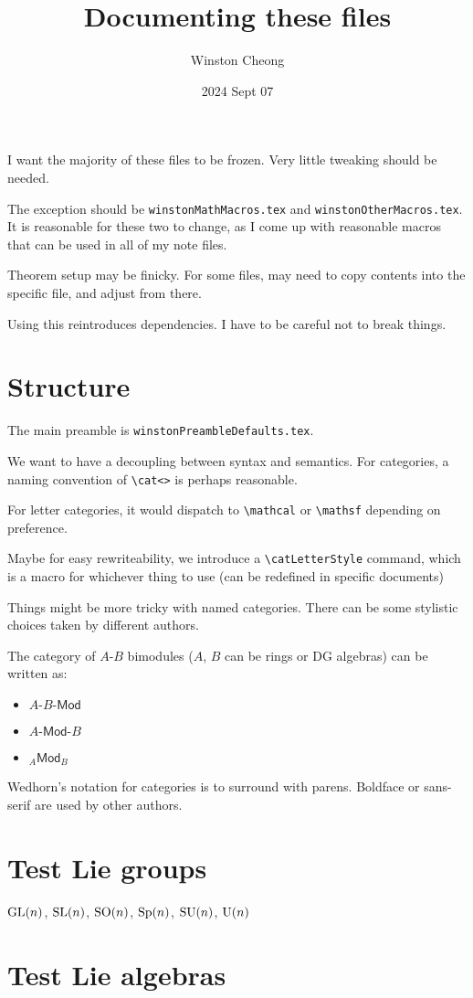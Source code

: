 \documentclass{scrartcl}
\title{Documenting these files}
\author{Winston Cheong}
\date{2024 Sept 07}
\begin{document}
\maketitle

I want the majority of these files to be frozen.
Very little tweaking should be needed.

The exception should be \texttt{winstonMathMacros.tex} and
\texttt{winstonOtherMacros.tex}.
It is reasonable for these two to change, as I come up with reasonable macros that can be used in all of my note files.

Theorem setup may be finicky. For some files, may need to copy contents into the
specific file, and adjust from there.



Using this reintroduces dependencies. I have to be careful not to break things.

\section{Structure}

The main preamble is \texttt{winstonPreambleDefaults.tex}.

We want to have a decoupling between syntax and semantics.
For categories, a naming convention of \verb|\cat<>| is perhaps reasonable.

For letter categories, it would dispatch to \verb|\mathcal| or \verb|\mathsf| depending on preference.

Maybe for easy rewriteability, we introduce a \verb|\catLetterStyle| command,
which is a macro for whichever thing to use (can be redefined in specific
documents)

Things might be more tricky with named categories. There can be some stylistic
choices taken by different authors.

The category of $A$-$B$ bimodules ($A$, $B$ can be rings or DG algebras) can be written as:
\begin{itemize}
    \item $A\text{-}B\text{-}\mathsf{Mod}$
    \item $A\text{-}\mathsf{Mod}\text{-}B$
    \item ${}_A\mathsf{Mod}_{B}$
\end{itemize}


Wedhorn's notation for categories is to surround with parens.
Boldface or sans-serif are used by other authors.

\section{Test Lie groups}

$\mathrm{GL}(n)$, $\mathrm{SL}(n)$, $\mathrm{SO}(n)$, $\mathrm{Sp}(n)$, $\mathrm{SU}(n)$, $\mathrm{U}(n)$

\section{Test Lie algebras}

\end{document}
